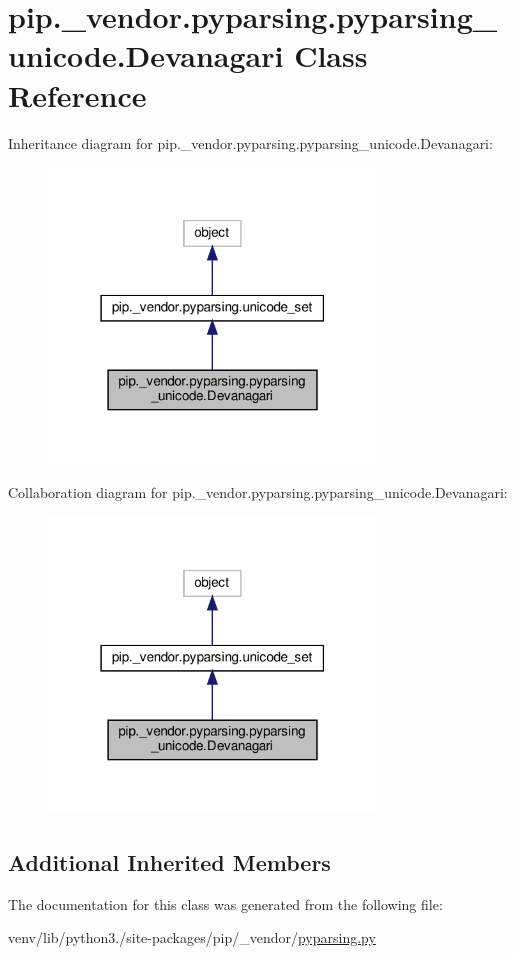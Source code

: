 \hypertarget{classpip_1_1__vendor_1_1pyparsing_1_1pyparsing__unicode_1_1Devanagari}{}\section{pip.\+\_\+vendor.\+pyparsing.\+pyparsing\+\_\+unicode.\+Devanagari Class Reference}
\label{classpip_1_1__vendor_1_1pyparsing_1_1pyparsing__unicode_1_1Devanagari}


Inheritance diagram for pip.\+\_\+vendor.\+pyparsing.\+pyparsing\+\_\+unicode.\+Devanagari\+:
\nopagebreak
\begin{figure}[H]
\begin{center}
\leavevmode
\includegraphics[width=247pt]{classpip_1_1__vendor_1_1pyparsing_1_1pyparsing__unicode_1_1Devanagari__inherit__graph}
\end{center}
\end{figure}


Collaboration diagram for pip.\+\_\+vendor.\+pyparsing.\+pyparsing\+\_\+unicode.\+Devanagari\+:
\nopagebreak
\begin{figure}[H]
\begin{center}
\leavevmode
\includegraphics[width=247pt]{classpip_1_1__vendor_1_1pyparsing_1_1pyparsing__unicode_1_1Devanagari__coll__graph}
\end{center}
\end{figure}
\subsection*{Additional Inherited Members}


The documentation for this class was generated from the following file\+:\begin{DoxyCompactItemize}
\item 
venv/lib/python3./site-\/packages/pip/\+\_\+vendor/\hyperlink{pip_2__vendor_2pyparsing_8py}{pyparsing.\+py}\end{DoxyCompactItemize}
